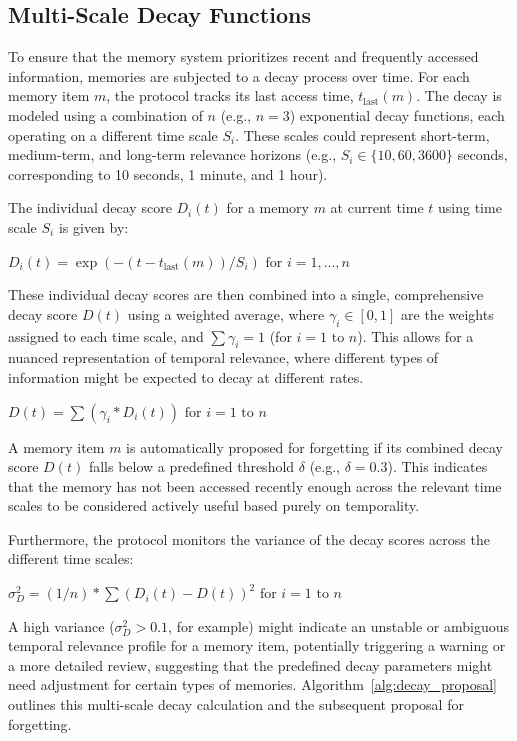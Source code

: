 \documentclass[conference]{IEEEtran}
\begin{document}
\subsection{Multi-Scale Decay Functions}

To ensure that the memory system prioritizes recent and frequently accessed information, memories are subjected to a decay process over time. For each memory item $m$, the protocol tracks its last access time, $t_{\text{last}}(m)$. The decay is modeled using a combination of $n$ (e.g., $n = 3$) exponential decay functions, each operating on a different time scale $S_i$. These scales could represent short-term, medium-term, and long-term relevance horizons (e.g., $S_i \in \{10, 60, 3600\}$ seconds, corresponding to 10 seconds, 1 minute, and 1 hour).

The individual decay score $D_i(t)$ for a memory $m$ at current time $t$ using time scale $S_i$ is given by:

$D_i(t) = \exp(-(t - t_{\text{last}}(m)) / S_i) \text{ for } i = 1, ..., n$

These individual decay scores are then combined into a single, comprehensive decay score $D(t)$ using a weighted average, where $\gamma_i \in [0, 1]$ are the weights assigned to each time scale, and $\sum \gamma_i = 1$ (for $i = 1 \text{ to } n$). This allows for a nuanced representation of temporal relevance, where different types of information might be expected to decay at different rates.

$D(t) = \sum (\gamma_i * D_i(t)) \text{ for } i = 1 \text{ to } n$

A memory item $m$ is automatically proposed for forgetting if its combined decay score $D(t)$ falls below a predefined threshold $\delta$ (e.g., $\delta = 0.3$). This indicates that the memory has not been accessed recently enough across the relevant time scales to be considered actively useful based purely on temporality.

Furthermore, the protocol monitors the variance of the decay scores across the different time scales:

$\sigma_D^2 = (1/n) * \sum (D_i(t) - D(t))^2 \text{ for } i = 1 \text{ to } n$

A high variance ($\sigma_D^2 > 0.1$, for example) might indicate an unstable or ambiguous temporal relevance profile for a memory item, potentially triggering a warning or a more detailed review, suggesting that the predefined decay parameters might need adjustment for certain types of memories. Algorithm~\ref{alg:decay_proposal} outlines this multi-scale decay calculation and the subsequent proposal for forgetting.
\end{document}
